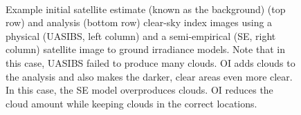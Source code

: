 \begin{figure}[htbp]
\centering
\captionsetup[subfigure]{labelformat=empty}
\vspace{-1em}\\
\caption[Improved satellite irradiance estimates using optimal
interpolation]{Example initial satellite estimate (known as the
  background) (top row) and analysis (bottom row) clear-sky index
  images using a physical (UASIBS, left column) and a semi-empirical
  (SE, right column) satellite image to ground irradiance models. Note
  that in this case, UASIBS failed to produce many clouds. OI adds
  clouds to the analysis and also makes the darker, clear areas even
  more clear.  In this case, the SE model overproduces clouds. OI
  reduces the cloud amount while keeping clouds in the correct
  locations.}
\label{fig:oi_example}
\end{figure}

